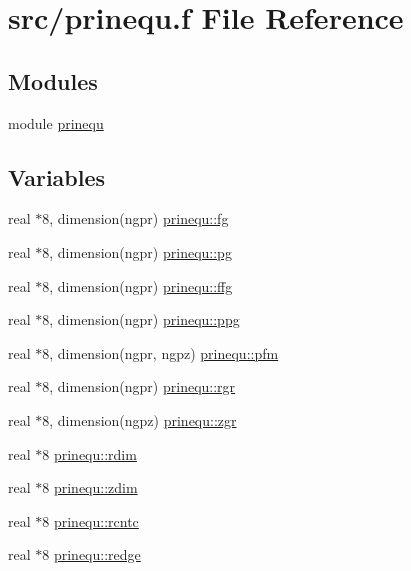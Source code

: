 \hypertarget{prinequ_8f}{
\section{src/prinequ.f File Reference}
\label{prinequ_8f}
}
\subsection*{Modules}
\begin{CompactItemize}
\item 
module \hyperlink{namespaceprinequ}{prinequ}
\end{CompactItemize}
\subsection*{Variables}
\begin{CompactItemize}
\item 
real $\ast$8, dimension(ngpr) \hyperlink{namespaceprinequ_8c941e8d1710a7e26be0b09de01cc307}{prinequ::fg}
\item 
real $\ast$8, dimension(ngpr) \hyperlink{namespaceprinequ_27c808b12ae848c864b2ff5c5369e351}{prinequ::pg}
\item 
real $\ast$8, dimension(ngpr) \hyperlink{namespaceprinequ_f8556fceda08dd098e7ba4d9057fd31c}{prinequ::ffg}
\item 
real $\ast$8, dimension(ngpr) \hyperlink{namespaceprinequ_d9209d25e3945dd8a3d16e06dd159380}{prinequ::ppg}
\item 
real $\ast$8, dimension(ngpr, ngpz) \hyperlink{namespaceprinequ_bfe2ebab5c6892d669d60769f6271de2}{prinequ::pfm}
\item 
real $\ast$8, dimension(ngpr) \hyperlink{namespaceprinequ_138b25820f0b9623a1ad87f0e82f7d8d}{prinequ::rgr}
\item 
real $\ast$8, dimension(ngpz) \hyperlink{namespaceprinequ_fa746dd8a2614f015972663b4d587fd2}{prinequ::zgr}
\item 
real $\ast$8 \hyperlink{namespaceprinequ_abf70da38478de9db7c738b09c099027}{prinequ::rdim}
\item 
real $\ast$8 \hyperlink{namespaceprinequ_3a44d82c8ebf602b6048ebf656101a4b}{prinequ::zdim}
\item 
real $\ast$8 \hyperlink{namespaceprinequ_83e3bb5db3b95a0d14bd1261dbc323ab}{prinequ::rcntc}
\item 
real $\ast$8 \hyperlink{namespaceprinequ_daccbb92c2237bfd27acd42cfc7a1753}{prinequ::redge}
\item 

\end{CompactItemize}
